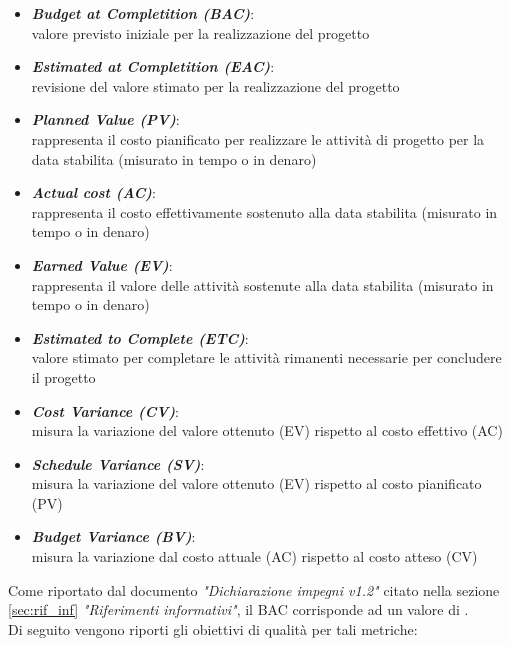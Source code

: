 \begin{itemize}
    \item \textbf{\emph{Budget at Completition (BAC)}}:\\
    valore previsto iniziale per la realizzazione del progetto
    \item \textbf{\emph{Estimated at Completition (EAC)}}:\\
    revisione del valore stimato per la realizzazione del progetto
    \item \textbf{\emph{Planned Value (PV)}}:\\
    rappresenta il costo pianificato per realizzare le attività di progetto per la data stabilita (misurato in tempo o in denaro)
    \item \textbf{\emph{Actual cost (AC)}}:\\
    rappresenta il costo effettivamente sostenuto alla data stabilita (misurato in tempo o in denaro)
    \item \textbf{\emph{Earned Value (EV)}}:\\
    rappresenta il valore delle attività sostenute alla data stabilita (misurato in tempo o in denaro)
    \item \textbf{\emph{Estimated to Complete (ETC)}}:\\
    valore stimato per completare le attività rimanenti necessarie per concludere il progetto
    \item \textbf{\emph{Cost Variance (CV)}}:\\
    misura la variazione del valore ottenuto (EV) rispetto al costo effettivo (AC)
    \item \textbf{\emph{Schedule Variance (SV)}}:\\
    misura la variazione del valore ottenuto (EV) rispetto al costo pianificato (PV)
    \item \textbf{\emph{Budget Variance (BV)}}:\\
    misura la variazione dal costo attuale (AC) rispetto al costo atteso (CV)
    \end{itemize}

Come riportato dal documento \emph{"Dichiarazione impegni v1.2"} citato nella sezione \ref{sec:rif_inf} \emph{"Riferimenti informativi"}, il BAC corrisponde ad un valore di .\\
\newpage
Di seguito vengono riporti gli obiettivi di qualità per tali metriche:

